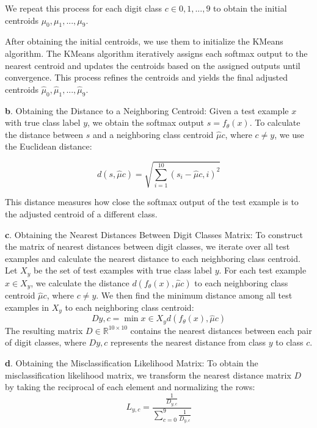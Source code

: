 We repeat this process for each digit class $c \in {0, 1, ..., 9}$ to obtain the initial centroids $\mu_0, \mu_1, ..., \mu_9$.

After obtaining the initial centroids, we use them to initialize the KMeans algorithm. The KMeans algorithm iteratively assigns each softmax output to the nearest centroid and updates the centroids based on the assigned outputs until convergence. This process refines the centroids and yields the final adjusted centroids $\hat{\mu}_0, \hat{\mu}_1, ..., \hat{\mu}_9$.

\textbf{b}. Obtaining the Distance to a Neighboring Centroid:
Given a test example $x$ with true class label $y$, we obtain the softmax output $s = f_\theta(x)$. To calculate the distance between $s$ and a neighboring class centroid $\hat{\mu}c$, where $c \neq y$, we use the Euclidean distance:

\begin{equation}
d(s, \hat{\mu}c) = \sqrt{\sum\limits_{i=1}^{10} (s_i - \hat{\mu}{c,i})^2}
\label{eq:euclidean_distance_to_neighboring_centroid}
\end{equation}

This distance measures how close the softmax output of the test example is to the adjusted centroid of a different class.

\textbf{c}. Obtaining the Nearest Distances Between Digit Classes Matrix:
To construct the matrix of nearest distances between digit classes, we iterate over all test examples and calculate the nearest distance to each neighboring class centroid. Let $X_y$ be the set of test examples with true class label $y$. For each test example $x \in X_y$, we calculate the distance $d(f_\theta(x), \hat{\mu}c)$ to each neighboring class centroid $\hat{\mu}c$, where $c \neq y$.
We then find the minimum distance among all test examples in $X_y$ to each neighboring class centroid:
\begin{equation}
D{y,c} = \min{x \in X_y} d(f_\theta(x), \hat{\mu}c)
\label{eq:min_distance_to_near_centroid}
\end{equation}
The resulting matrix $D \in \mathbb{R}^{10 \times 10}$ contains the nearest distances between each pair of digit classes, where $D{y,c}$ represents the nearest distance from class $y$ to class $c$.

\textbf{d}. Obtaining the Misclassification Likelihood Matrix:
To obtain the misclassification likelihood matrix, we transform the nearest distance matrix $D$ by taking the reciprocal of each element and normalizing the rows:
\begin{equation}
L_{y,c} = \frac{\frac{1}{D_{y,c}}}{\sum\limits_{c=0}^9 \frac{1}{D_{y,c}}}
\label{eq:reciprocal_distance_matrix_eg_likelihood_matrix}
\end{equation}

